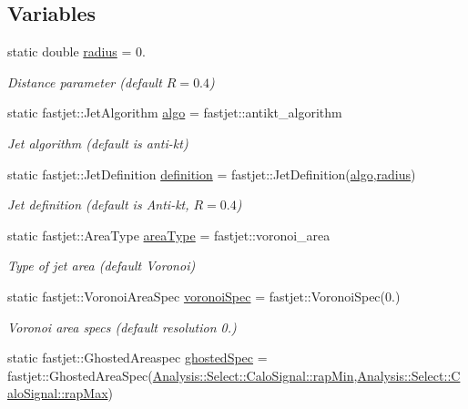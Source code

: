 \subsection*{Variables}
\begin{DoxyCompactItemize}
\item 
static double \hyperlink{namespaceAnalysis_1_1Config_1_1RecoJet_a794023c376e6d0221d52f71275229b41}{radius} = 0.
\begin{DoxyCompactList}\small\item\em Distance parameter (default $ R = 0.4 $) \end{DoxyCompactList}\item 
static fastjet\+::\+Jet\+Algorithm \hyperlink{namespaceAnalysis_1_1Config_1_1RecoJet_afe52c6bcca8e10c9c07996cbf4dc6a59}{algo} = fastjet\+::antikt\+\_\+algorithm
\begin{DoxyCompactList}\small\item\em Jet algorithm (default is anti-\/kt) \end{DoxyCompactList}\item 
static fastjet\+::\+Jet\+Definition \hyperlink{namespaceAnalysis_1_1Config_1_1RecoJet_ae0c23bbd5e0420037cbbb9f7929da17f}{definition} = fastjet\+::\+Jet\+Definition(\hyperlink{namespaceAnalysis_1_1Config_1_1RecoJet_afe52c6bcca8e10c9c07996cbf4dc6a59}{algo},\hyperlink{namespaceAnalysis_1_1Config_1_1RecoJet_a794023c376e6d0221d52f71275229b41}{radius})
\begin{DoxyCompactList}\small\item\em Jet definition (default is Anti-\/kt, $ R = 0.4 $) \end{DoxyCompactList}\item 
static fastjet\+::\+Area\+Type \hyperlink{namespaceAnalysis_1_1Config_1_1RecoJet_a7c2d1fae6f1b2f14bf18c5a2ac3d106f}{area\+Type} = fastjet\+::voronoi\+\_\+area
\begin{DoxyCompactList}\small\item\em Type of jet area (default Voronoi) \end{DoxyCompactList}\item 
static fastjet\+::\+Voronoi\+Area\+Spec \hyperlink{namespaceAnalysis_1_1Config_1_1RecoJet_a851b86d5a4096ee867e561f0489a4062}{voronoi\+Spec} = fastjet\+::\+Voronoi\+Spec(0.)
\begin{DoxyCompactList}\small\item\em Voronoi area specs (default resolution 0.) \end{DoxyCompactList}\item 
static fastjet\+::\+Ghosted\+Areaspec \hyperlink{namespaceAnalysis_1_1Config_1_1RecoJet_a319c43bb7084593808400c0ac0b2f5a6}{ghosted\+Spec} = fastjet\+::\+Ghosted\+Area\+Spec(\hyperlink{namespaceAnalysis_1_1Select_1_1CaloSignal_aa11187307efce66323ce38d6afdd75d7}{Analysis\+::\+Select\+::\+Calo\+Signal\+::rap\+Min},\hyperlink{namespaceAnalysis_1_1Select_1_1CaloSignal_a358398a6fbba8bcfd3f534ccbf838aa8}{Analysis\+::\+Select\+::\+Calo\+Signal\+::rap\+Max})

\end{DoxyCompactItemize}
